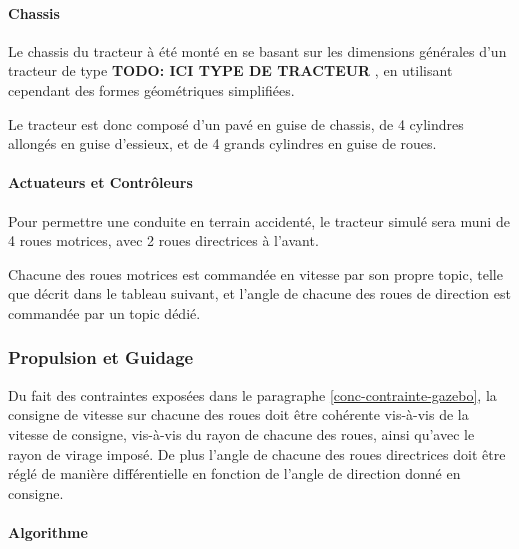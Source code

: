 \documentclass[12pt,a4paper]{report}
\begin{document}
			\paragraph{Chassis}
			Le chassis du tracteur à été monté en se basant sur les dimensions générales d'un tracteur de type \textbf{TODO: ICI TYPE DE TRACTEUR} , en utilisant cependant des formes géométriques simplifiées.
			\newline
			
			Le tracteur est donc composé d'un pavé en guise de chassis, de 4 cylindres allongés en guise d'essieux, et de 4 grands cylindres en guise de roues.
			
			\paragraph{Actuateurs et Contrôleurs}
			
			Pour permettre une conduite en terrain accidenté, le tracteur simulé sera muni de 4 roues motrices, avec 2 roues directrices à l'avant.
			
			\para Chacune des roues motrices est commandée en vitesse par son propre topic, telle que décrit dans le tableau suivant, et l'angle de chacune des roues de direction est commandée par un topic dédié.
			
		\subsubsection{Propulsion et Guidage}
		
			Du fait des contraintes exposées dans le paragraphe \ref{conc-contrainte-gazebo}, la consigne de vitesse sur chacune des roues doit être cohérente vis-à-vis de la vitesse de consigne, vis-à-vis du rayon de chacune des roues, ainsi qu'avec le rayon de virage imposé. De plus l'angle de chacune des roues directrices doit être réglé de manière différentielle en fonction de l'angle de direction donné en consigne.
			
			\paragraph{Algorithme}
			\label{algo-steering}
			
\end{document}
